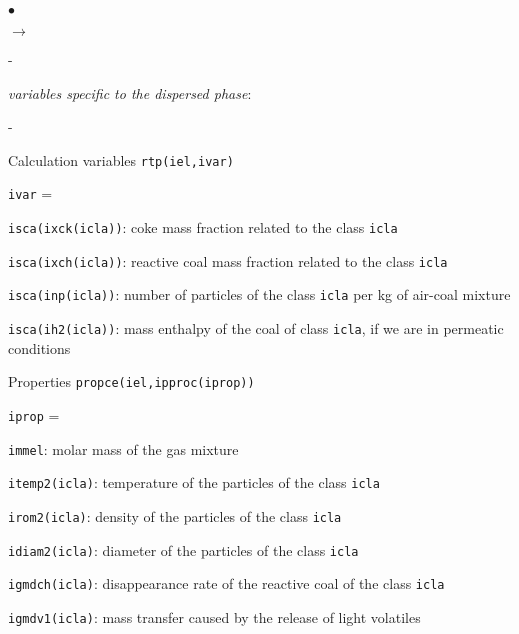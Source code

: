 {{\begin{list}{$\bullet$}{}
\begin{list}{$\rightarrow$}{}
\begin{list}{}{}
\begin{list}{-}{}
                    \end{list}
              \item {\em variables specific to the dispersed phase}:
              \begin{list}{-}{}
               \item Calculation variables \texttt{rtp(iel,ivar)}
                     \begin{list}{\texttt{ivar} = }{}
                      \item \texttt{isca(ixck(icla))}: coke mass
                            fraction related to the class \texttt{icla}
                      \item \texttt{isca(ixch(icla))}: reactive coal
                            mass fraction related to the class \texttt{icla}
                      \item \texttt{isca(inp(icla))}: number of
                            particles of the class \texttt{icla} per kg of
                            air-coal mixture
                      \item \texttt{isca(ih2(icla))}: mass enthalpy of
                            the coal of class \texttt{icla}, if we are in
                            permeatic conditions
                     \end{list}
               \item Properties \texttt{propce(iel,ipproc(iprop))}
                     \begin{list}{\texttt{iprop} = }{}
                      \item \texttt{immel}: molar mass of the gas mixture
                      \item \texttt{itemp2(icla)}: temperature of
                            the particles of the class \texttt{icla}
                      \item \texttt{irom2(icla)}: density of
                            the particles of the class \texttt{icla}
                      \item \texttt{idiam2(icla)}: diameter of the
                            particles of the class \texttt{icla}
                      \item \texttt{igmdch(icla)}: disappearance
                            rate of the reactive coal of the class \texttt{icla}
                      \item \texttt{igmdv1(icla)}: mass transfer
                            caused by the release of light volatiles

\end{list}
\end{list}
\end{list}
\end{list}
\end{list}}}
